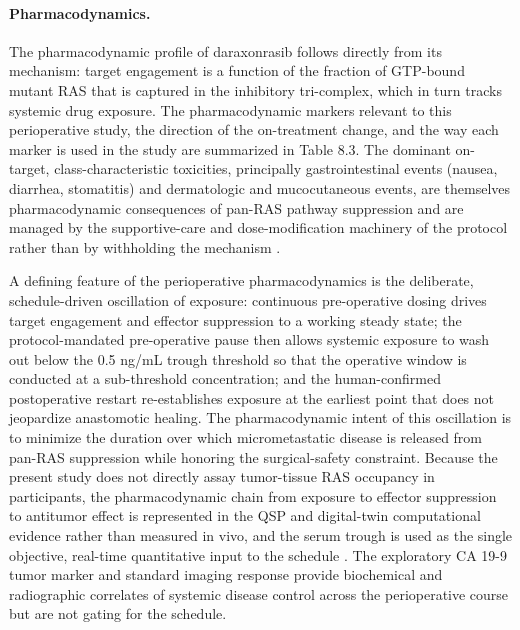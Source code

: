 \paragraph{Pharmacodynamics.}
The pharmacodynamic profile of daraxonrasib follows directly from its mechanism:
target engagement is a function of the fraction of GTP-bound mutant RAS that is
captured in the inhibitory tri-complex, which in turn tracks systemic drug
exposure. The pharmacodynamic markers relevant to this perioperative study, the
direction of the on-treatment change, and the way each marker is used in the
study are summarized in Table 8.3. The dominant on-target, class-characteristic
toxicities, principally gastrointestinal events (nausea, diarrhea, stomatitis)
and dermatologic and mucocutaneous events, are themselves pharmacodynamic
consequences of pan-RAS pathway suppression and are managed by the supportive-care
and dose-modification machinery of the protocol rather than by withholding the
mechanism \cite{onpremwhippl}.

A defining feature of the perioperative pharmacodynamics is the deliberate,
schedule-driven oscillation of exposure: continuous pre-operative dosing drives
target engagement and effector suppression to a working steady state; the
protocol-mandated pre-operative pause then allows systemic exposure to wash out
below the 0.5 ng/mL trough threshold so that the operative window is conducted at
a sub-threshold concentration; and the human-confirmed postoperative restart
re-establishes exposure at the earliest point that does not jeopardize anastomotic
healing. The pharmacodynamic intent of this oscillation is to minimize the
duration over which micrometastatic disease is released from pan-RAS suppression
while honoring the surgical-safety constraint. Because the present study does not
directly assay tumor-tissue RAS occupancy in participants, the pharmacodynamic
chain from exposure to effector suppression to antitumor effect is represented in
the QSP and digital-twin computational evidence rather than measured in vivo, and
the serum trough is used as the single objective, real-time quantitative input to
the schedule \cite{qspmetpancre,fdadigtwinpc,onpremwhippl}. The exploratory CA
19-9 tumor marker and standard imaging response provide biochemical and
radiographic correlates of systemic disease control across the perioperative
course but are not gating for the schedule.


